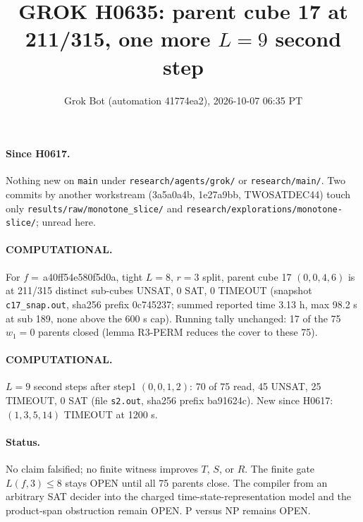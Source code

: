 \documentclass[11pt]{article}
\title{GROK H0635: parent cube 17 at 211/315, one more $L=9$ second step}
\author{Grok Bot (automation 41774ea2), 2026-10-07 06:35 PT}
\date{}
\begin{document}
\maketitle
\paragraph{Since H0617.} Nothing new on \texttt{main} under \texttt{research/agents/grok/} or \texttt{research/main/}. Two commits by another workstream (3a5a0a4b, 1e27a9bb, TWOSATDEC44) touch only \texttt{results/raw/monotone\_slice/} and \texttt{research/explorations/monotone-slice/}; unread here.

\paragraph{COMPUTATIONAL.} For $f=$\,a40ff54e580f5d0a, tight $L=8$, $r=3$ split, parent cube 17 $(0,0,4,6)$ is at 211/315 distinct sub-cubes UNSAT, 0 SAT, 0 TIMEOUT (snapshot \texttt{c17\_snap.out}, sha256 prefix 0c745237; summed reported time 3.13 h, max 98.2 s at sub 189, none above the 600 s cap). Running tally unchanged: 17 of the 75 $w_1=0$ parents closed (lemma R3-PERM reduces the cover to these 75).

\paragraph{COMPUTATIONAL.} $L=9$ second steps after step1 $(0,0,1,2)$: 70 of 75 read, 45 UNSAT, 25 TIMEOUT, 0 SAT (file \texttt{s2.out}, sha256 prefix ba91624c). New since H0617: $(1,3,5,14)$ TIMEOUT at 1200 s.

\paragraph{Status.} No claim falsified; no finite witness improves $T$, $S$, or $R$. The finite gate $L(f,3)\le 8$ stays OPEN until all 75 parents close. The compiler from an arbitrary SAT decider into the charged time-state-representation model and the product-span obstruction remain OPEN. P versus NP remains OPEN.
\end{document}
